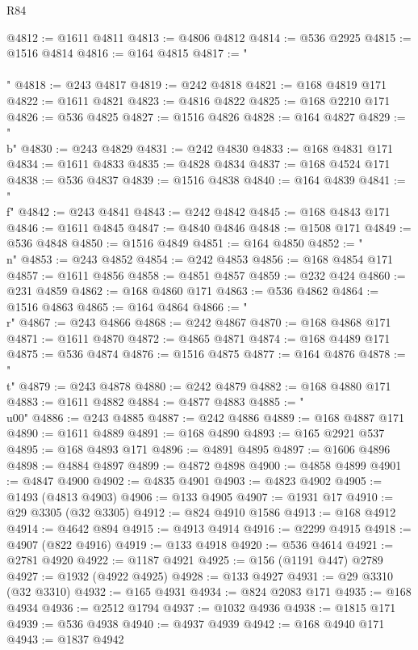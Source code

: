 \begin{lexlean}{R84}
\begin{coremodule}
@4812 := @1611 @4811
@4813 := @4806 @4812
@4814 := @536 @2925
@4815 := @1516 @4814
@4816 := @164 @4815
@4817 := "\\\\"
@4818 := @243 @4817
@4819 := @242 @4818
@4821 := @168 @4819 @171
@4822 := @1611 @4821
@4823 := @4816 @4822
@4825 := @168 @2210 @171
@4826 := @536 @4825
@4827 := @1516 @4826
@4828 := @164 @4827
@4829 := "\\b"
@4830 := @243 @4829
@4831 := @242 @4830
@4833 := @168 @4831 @171
@4834 := @1611 @4833
@4835 := @4828 @4834
@4837 := @168 @4524 @171
@4838 := @536 @4837
@4839 := @1516 @4838
@4840 := @164 @4839
@4841 := "\\f"
@4842 := @243 @4841
@4843 := @242 @4842
@4845 := @168 @4843 @171
@4846 := @1611 @4845
@4847 := @4840 @4846
@4848 := @1508 @171
@4849 := @536 @4848
@4850 := @1516 @4849
@4851 := @164 @4850
@4852 := "\\n"
@4853 := @243 @4852
@4854 := @242 @4853
@4856 := @168 @4854 @171
@4857 := @1611 @4856
@4858 := @4851 @4857
@4859 := @232 @424
@4860 := @231 @4859
@4862 := @168 @4860 @171
@4863 := @536 @4862
@4864 := @1516 @4863
@4865 := @164 @4864
@4866 := "\\r"
@4867 := @243 @4866
@4868 := @242 @4867
@4870 := @168 @4868 @171
@4871 := @1611 @4870
@4872 := @4865 @4871
@4874 := @168 @4489 @171
@4875 := @536 @4874
@4876 := @1516 @4875
@4877 := @164 @4876
@4878 := "\\t"
@4879 := @243 @4878
@4880 := @242 @4879
@4882 := @168 @4880 @171
@4883 := @1611 @4882
@4884 := @4877 @4883
@4885 := "\\u00"
@4886 := @243 @4885
@4887 := @242 @4886
@4889 := @168 @4887 @171
@4890 := @1611 @4889
@4891 := @168 @4890
@4893 := @165 @2921 @537
@4895 := @168 @4893 @171
@4896 := @4891 @4895
@4897 := @1606 @4896
@4898 := @4884 @4897
@4899 := @4872 @4898
@4900 := @4858 @4899
@4901 := @4847 @4900
@4902 := @4835 @4901
@4903 := @4823 @4902
@4905 := @1493 (@4813 @4903)
@4906 := @133 @4905
@4907 := @1931 @17
@4910 := @29 @3305 (@32 @3305)
@4912 := @824 @4910 @1586
@4913 := @168 @4912
@4914 := @4642 @894
@4915 := @4913 @4914
@4916 := @2299 @4915
@4918 := @4907 (@822 @4916)
@4919 := @133 @4918
@4920 := @536 @4614
@4921 := @2781 @4920
@4922 := @1187 @4921
@4925 := @156 (@1191 @447) @2789
@4927 := @1932 (@4922 @4925)
@4928 := @133 @4927
@4931 := @29 @3310 (@32 @3310)
@4932 := @165 @4931
@4934 := @824 @2083 @171
@4935 := @168 @4934
@4936 := @2512 @1794
@4937 := @1032 @4936
@4938 := @1815 @171
@4939 := @536 @4938
@4940 := @4937 @4939
@4942 := @168 @4940 @171
@4943 := @1837 @4942

\end{coremodule}
\end{lexlean}
